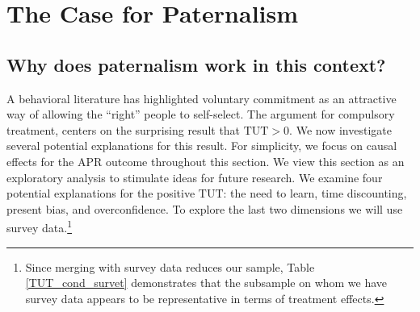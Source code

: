 \documentclass[ecta,nameyear,final]{econsocart}
\begin{document}
\section{The Case for Paternalism}
\label{Paternalism}

\subsection{Why does paternalism work in this context?}
\label{why_paternalism}

A behavioral literature has highlighted voluntary commitment as an attractive way of allowing the ``right'' people to self-select. %
The argument for compulsory treatment, centers on the surprising result that $\text{TUT}>0$. We now investigate several potential explanations for this result.
For simplicity, we focus on causal effects for the APR outcome throughout this section. We view this section as an exploratory analysis to stimulate ideas for future research. We examine four potential explanations for the positive $\text{TUT}$: the need to learn, time discounting, present bias, and overconfidence.  To explore the last two dimensions we will use survey data.\footnote{Since merging with survey data reduces our sample, Table \ref{TUT_cond_survet} demonstrates that the subsample on whom we have survey data appears to be representative in terms of treatment effects.}  
   
\end{document}
